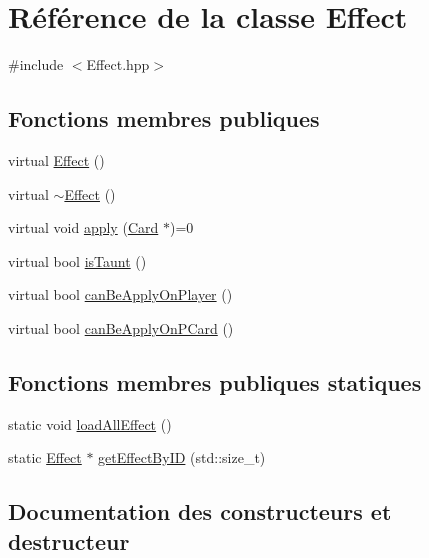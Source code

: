 \hypertarget{classEffect}{}\section{Référence de la classe Effect}
\label{classEffect}


{\ttfamily \#include $<$Effect.\+hpp$>$}

\subsection*{Fonctions membres publiques}
\begin{DoxyCompactItemize}
\item 
virtual \hyperlink{classEffect_ae70bfffd7ffd1538c33a2b4590fec0da}{Effect} ()
\item 
virtual \hyperlink{classEffect_ab0f471df484d3ef351b704fef39a7072}{$\sim$\+Effect} ()
\item 
virtual void \hyperlink{classEffect_a9ba9e7f094e4ca074f12ed246923671f}{apply} (\hyperlink{classCard}{Card} $\ast$)=0
\item 
virtual bool \hyperlink{classEffect_adb7655cc87e0602f6f608103ff388a6f}{is\+Taunt} ()
\item 
virtual bool \hyperlink{classEffect_a23e7eba966b28f051ec12865f53cd092}{can\+Be\+Apply\+On\+Player} ()
\item 
virtual bool \hyperlink{classEffect_a81611bfcbbd800ac40b3c38146fb7277}{can\+Be\+Apply\+On\+P\+Card} ()
\end{DoxyCompactItemize}
\subsection*{Fonctions membres publiques statiques}
\begin{DoxyCompactItemize}
\item 
static void \hyperlink{classEffect_ae185e5fd1219ac1d7ffbcd51d0ace58c}{load\+All\+Effect} ()
\item 
static \hyperlink{classEffect}{Effect} $\ast$ \hyperlink{classEffect_a146cdf511868872b7e1879c07c6eb367}{get\+Effect\+By\+I\+D} (std\+::size\+\_\+t)
\end{DoxyCompactItemize}


\subsection{Documentation des constructeurs et destructeur}
\hypertarget{classEffect_ae70bfffd7ffd1538c33a2b4590fec0da}{}
